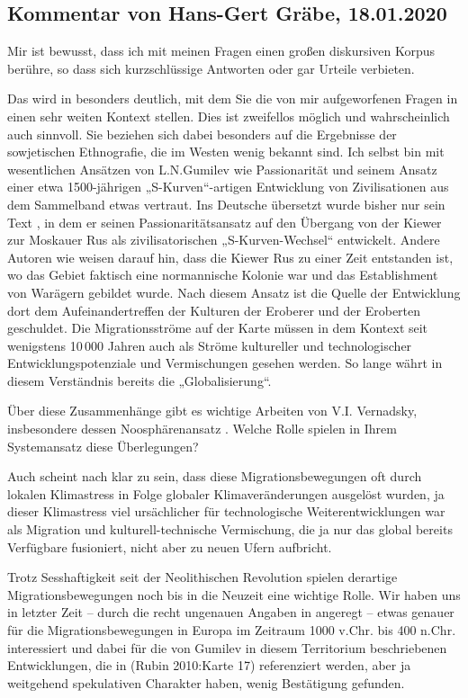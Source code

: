 \documentclass[11pt,a4paper]{article}
\begin{document}
\subsection{Kommentar von Hans-Gert Gräbe, 18.01.2020}

Mir ist bewusst, dass ich mit meinen Fragen einen großen diskursiven Korpus
berühre, so dass sich kurzschlüssige Antworten oder gar Urteile verbieten.

Das wird in \cite{Rubin2010} besonders deutlich, mit dem Sie die von mir
aufgeworfenen Fragen in einen sehr weiten Kontext stellen. Dies ist zweifellos
möglich und wahrscheinlich auch sinnvoll. Sie beziehen sich dabei besonders
auf die Ergebnisse der sowjetischen Ethnografie, die im Westen wenig bekannt
sind.  Ich selbst bin mit wesentlichen Ansätzen von L.N.Gumilev wie
Passionarität und seinem Ansatz einer etwa 1500-jährigen „S-Kurven“-artigen
Entwicklung von Zivilisationen aus dem Sammelband \cite{Gumilev1994} etwas
vertraut.  Ins Deutsche übersetzt wurde bisher nur sein Text
\cite{Gumilev2017}, in dem er seinen Passionaritätsansatz auf den Übergang
von der Kiewer zur Moskauer Rus als zivilisatorischen „S-Kurven-Wechsel“
entwickelt.  Andere Autoren wie \cite{Adji2011} weisen darauf hin, dass die
Kiewer Rus zu einer Zeit entstanden ist, wo das Gebiet faktisch eine
normannische Kolonie war und das Establishment von Warägern gebildet wurde.
Nach diesem Ansatz ist die Quelle der Entwicklung dort dem Aufeinandertreffen
der Kulturen der Eroberer und der Eroberten geschuldet.  Die Migrationsströme
auf der Karte \cite[Karte 5]{Rubin2010} müssen in dem Kontext seit wenigstens
10\,000 Jahren auch als Ströme kultureller und technologischer
Entwicklungspotenziale und Vermischungen gesehen werden. So lange währt in
diesem Verständnis bereits die „Globalisierung“.

Über diese Zusammenhänge gibt es wichtige Arbeiten von V.I. Vernadsky,
insbesondere dessen Noosphärenansatz \cite{Vernadsky1997}. Welche Rolle
spielen in Ihrem Systemansatz diese Überlegungen?

Auch scheint nach \cite{KlixLanius1999} klar zu sein, dass diese
Migrationsbewegungen oft durch lokalen Klimastress in Folge globaler
Klimaveränderungen ausgelöst wurden, ja dieser Klimastress viel ursächlicher
für technologische Weiterentwicklungen war als Migration und
kulturell-technische Vermischung, die ja nur das global bereits Verfügbare
fusioniert, nicht aber zu neuen Ufern aufbricht.

Trotz Sesshaftigkeit seit der Neolithischen Revolution spielen derartige
Migrationsbewegungen noch bis in die Neuzeit eine wichtige Rolle.  Wir haben
uns in letzter Zeit -- durch die recht ungenauen Angaben in \cite{Adji2011}
angeregt -- etwas genauer für die Migrationsbewegungen in Europa im Zeitraum
1000 v.Chr. bis 400 n.Chr. interessiert und dabei für die von Gumilev in
diesem Territorium beschriebenen Entwicklungen, die in (Rubin 2010:Karte 17)
referenziert werden, aber ja weitgehend spekulativen Charakter haben, wenig
Bestätigung gefunden.
\end{document}
